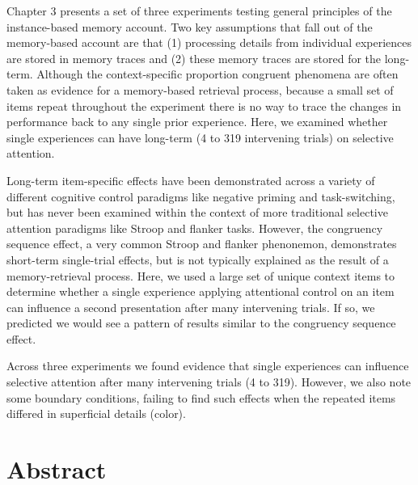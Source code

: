 \documentclass[]{DissertateCUNY}
\begin{document}
Chapter 3 presents a set of three experiments testing general principles
of the instance-based memory account. Two key assumptions that fall out
of the memory-based account are that (1) processing details from
individual experiences are stored in memory traces and (2) these memory
traces are stored for the long-term. Although the context-specific
proportion congruent phenomena are often taken as evidence for a
memory-based retrieval process, because a small set of items repeat
throughout the experiment there is no way to trace the changes in
performance back to any single prior experience. Here, we examined
whether single experiences can have long-term (4 to 319 intervening
trials) on selective attention.

Long-term item-specific effects have been demonstrated across a variety
of different cognitive control paradigms like negative priming and
task-switching, but has never been examined within the context of more
traditional selective attention paradigms like Stroop and flanker tasks.
However, the congruency sequence effect, a very common Stroop and
flanker phenonemon, demonstrates short-term single-trial effects, but is
not typically explained as the result of a memory-retrieval process.
Here, we used a large set of unique context items to determine whether a
single experience applying attentional control on an item can influence
a second presentation after many intervening trials. If so, we predicted
we would see a pattern of results similar to the congruency sequence
effect.

Across three experiments we found evidence that single experiences can
influence selective attention after many intervening trials (4 to 319).
However, we also note some boundary conditions, failing to find such
effects when the repeated items differed in superficial details (color).

\hypertarget{abstract-1}{%
\section{Abstract}\label{abstract-1}}
\end{document}
